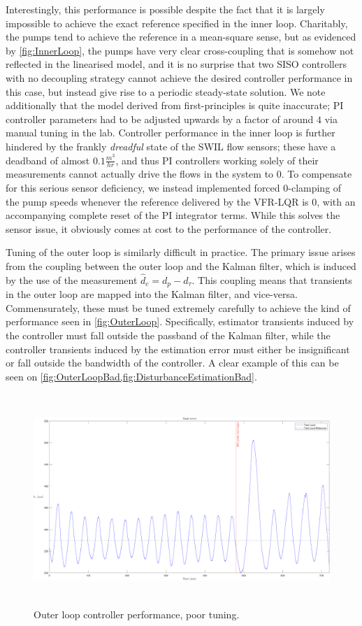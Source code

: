 Interestingly, this performance is possible despite the fact that it is largely impossible to achieve the exact reference specified in the inner loop. Charitably, the pumps tend to achieve the reference in a mean-square sense, but as evidenced by \cref{fig:InnerLoop}, the pumps have very clear cross-coupling that is somehow not reflected in the linearised model, and it is no surprise that two SISO controllers with no decoupling strategy cannot achieve the desired controller performance in this case, but instead give rise to a periodic steady-state solution. We note additionally that the model derived from first-principles is quite inaccurate; PI controller parameters had to be adjusted upwards by a factor of around $4$ via manual tuning in the lab. Controller performance in the inner loop is further hindered by the frankly \textit{dreadful} state of the SWIL flow sensors; these have a deadband of almost $0.1 \si{\frac{m^3}{hr}}$, and thus PI controllers working solely of their measurements cannot actually drive the flows in the system to $0$. To compensate for this serious sensor deficiency, we instead implemented forced $0$-clamping of the pump speeds whenever the reference delivered by the VFR-LQR is $0$, with an accompanying complete reset of the PI integrator terms. While this solves the sensor issue, it obviously comes at cost to the performance of the controller.

Tuning of the outer loop is similarly difficult in practice. The primary issue arises from the coupling between the outer loop and the Kalman filter, which is induced by the use of the measurement $\hat{d}_c = d_p - d_\tau$. This coupling means that transients in the outer loop are mapped into the Kalman filter, and vice-versa. Commensurately, these must be tuned extremely carefully to achieve the kind of performance seen in \cref{fig:OuterLoop}. Specifically, estimator transients induced by the controller must fall outside the passband of the Kalman filter, while the controller transients induced by the estimation error must either be insignificant or fall outside the bandwidth of the controller. A clear example of this can be seen on \cref{fig:OuterLoopBad,fig:DisturbanceEstimationBad}.

\clearpage

\begin{figure}[h!]
	\includegraphics[height=8cm,width=\linewidth]{Pictures/OuterLoopBad.pdf}
	\caption{Outer loop controller performance, poor tuning.}
	\label{fig:OuterLoopBad}
\end{figure}

